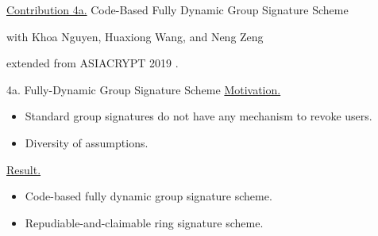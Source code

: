 \begin{frame}{}
	\underline{Contribution 4a.} Code-Based Fully Dynamic Group Signature Scheme
	
	{\small with Khoa Nguyen, Huaxiong Wang, and Neng Zeng}
	
	extended from ASIACRYPT 2019 \cite{NguyenTWZ19}.
\end{frame}

\begin{frame}{4a. Fully-Dynamic Group Signature Scheme}
	\underline{Motivation.}
	\begin{itemize}
		\item Standard group signatures do not have any mechanism to revoke users.
		\item Diversity of assumptions.
	\end{itemize}
	\underline{Result.}
	\begin{itemize}
		\item Code-based fully dynamic group signature scheme.
		\item Repudiable-and-claimable ring signature scheme.
	\end{itemize}
\end{frame}